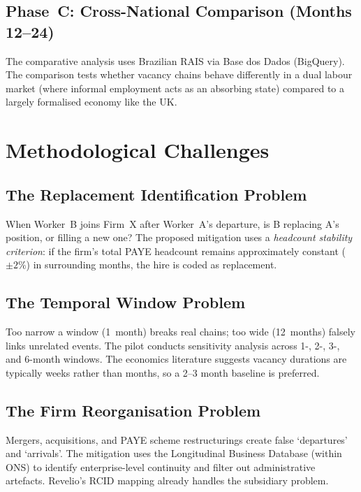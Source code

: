 \documentclass[a4paper]{tufte-handout}
\begin{document}
\subsection{Phase~C: Cross-National Comparison (Months 12--24)}

The comparative analysis uses Brazilian RAIS via Base dos Dados (BigQuery).
The comparison tests whether vacancy chains behave differently in a dual labour market (where informal employment acts as an absorbing state) compared to a largely formalised economy like the UK\@.


\section{Methodological Challenges}

\subsection{The Replacement Identification Problem}
When Worker~B joins Firm~X after Worker~A's departure, is B replacing A's position, or filling a new one? The proposed mitigation uses a \emph{headcount stability criterion}: if the firm's total PAYE headcount remains approximately constant (${\pm}2\%$) in surrounding months, the hire is coded as replacement.

\subsection{The Temporal Window Problem}
Too narrow a window (1~month) breaks real chains; too wide (12~months) falsely links unrelated events. The pilot conducts sensitivity analysis across 1-, 2-, 3-, and 6-month windows. The economics literature suggests vacancy durations are typically weeks rather than months, so a 2--3 month baseline is preferred.

\subsection{The Firm Reorganisation Problem}
Mergers, acquisitions, and PAYE scheme restructurings create false `departures' and `arrivals'. The mitigation uses the Longitudinal Business Database (within ONS) to identify enterprise-level continuity and filter out administrative artefacts. Revelio's RCID mapping already handles the subsidiary problem.
\end{document}
